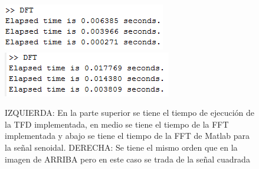 \documentclass[12pt]{article}
\begin{document}
\begin{figure}[h!]
 \centering
 \includegraphics[width=.3\textwidth]{seno.PNG}
 \includegraphics[width=.3\textwidth]{cuadrada.PNG}
 \caption{IZQUIERDA: En la parte superior se tiene el tiempo de ejecución de la TFD  implementada, en medio se tiene el tiempo de la FFT implementada y abajo se tiene el tiempo de la FFT de Matlab para la señal senoidal. DERECHA: Se tiene el mismo orden que en la imagen de ARRIBA pero en este caso se trada de la señal cuadrada}
 \label{fig:comparacion}
\end{figure}
\end{document}
